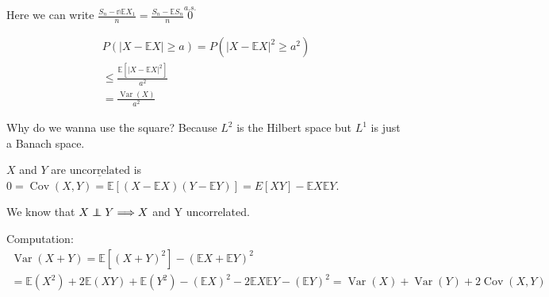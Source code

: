 \documentclass[11pt]{article}
\begin{document}
Here we can write $\frac{S_n - \mathbb{nE}X_1}{n} = \frac{S_n - \mathbb{E}S_n}{n}
\overset{a.s.}{0}$

\begin{lemma}
    \begin{align*}
        P(|X-\mathbb{E}X| \ge a)  =  P(|X-\mathbb{E}X|^{2} \ge a^{2})\\
        \le \frac{\mathbb{E}[|X-\mathbb{E}X|^{2}]}{a^{2}}\\
        = \frac{\operatorname{Var}(X)}{a^{2}}
    \end{align*}
    \begin{remark}
        Why do we wanna use the square? Because $L^{2}$ is the Hilbert space but $L^{1}$ is just a 
        Banach space.
    \end{remark}
\end{lemma}

\begin{definition}
    $X$ and $Y$ are $\underline{\text{uncorrelated}}$ is $0 = \operatorname{Cov}(X,Y)
    = \mathbb{E}[(X-\mathbb{E}X)(Y-\mathbb{E}Y)] = E[XY] - \mathbb{E}X \mathbb{E}Y$.
\end{definition}

We know that $X \independent Y \Longrightarrow X$ and Y uncorrelated.

Computation:
\begin{align*}
    \operatorname{Var}(X+Y) = \mathbb{E}[(X+Y)^{2}] - (\mathbb{E}X + \mathbb{E}Y)^{2}\\
    = \mathbb{E}(X^{2}) + 2\mathbb{E}(XY) + \mathbb{E}(Y^{2}) - (\mathbb{E}X)^{2} - 2\mathbb{E} X \mathbb{E}Y 
    - (\mathbb{E}Y)^{2} = \operatorname{Var}(X) + \operatorname{Var}(Y) + 2\operatorname{Cov}(X,Y)
\end{align*}
\end{document}
